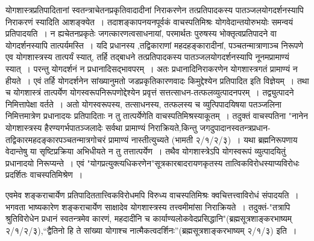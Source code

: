 {योगशास्त्रप्रतिपादितानां स्वतन्त्राचेतनप्रकृतिवादादीनां निराकरणेन तत्प्रतिपादकस्य पातञ्जलयोगदर्शनस्यापि निराकरणं स्यादिति आशङ्क्येत~। तदाशङ्कापनयनपूर्वकं वाचस्पतिमिश्रः योगवेदान्तयोरुभयोः समन्वयं प्रतिपादयति~। न ह्यचेतनप्रकृतेः जगत्कारणत्वसाधनायां, परमार्थतः पुरुषस्य भोक्तृत्वप्रतिपादने वा योगदर्शनस्यापि तात्पर्यमस्ति~। यदि प्रधानस्य ,तद्विकाराणां महदहङ्कारादीनां, पञ्चतन्मात्राणाञ्च निरूपणे एव योगशास्त्रस्य तात्पर्यं स्यात्, तर्हि तद्बाधने तत्प्रतिपादकस्य पातञ्जलयोगदर्शनस्यापि नूनमप्रामाण्यं स्यात्~। परन्तु योगदर्शनं न प्रधानादिसद्भावपरम्~। अतः प्रधानादिनिराकरणेन योगशास्त्रगतं प्रामाण्यं न हीयते~। एवं तर्हि योगदर्शनेन सांख्यानुमतो जडप्रकृतिकारणवादः किमुद्देश्येन प्रतिपादित इति विज्ञेयम्~। तथा च योगशास्त्रं तात्पर्येण योगस्वरूपनिरूपणोद्देश्येन प्रवृत्तं सत्तत्साधन-तत्फलव्युत्पादनपरम्~। तद्व्युत्पादने निमित्तापेक्षा वर्तते~। अतो योगस्वरूपस्य, तत्साधनस्य, तत्फलस्य च व्युत्पिपादयिषया पतञ्जलिना निमित्तमात्रेण प्रधानादयः प्रतिपादिताः न तु तात्पर्येणेति वाचस्पतिमिश्रस्याकूतम्~। तदुक्तं वाचस्पतिना "नानेन योगशास्त्रस्य हैरण्यगर्भपातञ्जलादेः सर्वथा प्रामाण्यं निराक्रियते,किन्तु जगदुपादानस्वतन्त्रप्रधान-तद्विकारमहदङ्कारपञ्चतन्मात्रगोचरं प्रामाण्यं नास्तीत्युच्यते (भामती २/१/२/३)~। यथा ब्रह्मनिरूपणाय वेदान्तेषु या सृष्टिप्रक्रिया अभिधीयते न तु तत्तात्पर्येण~। तथैव योगशास्त्रेऽपि योगस्वरूपं व्युत्पादयितुं प्रधानादयो निरूप्यन्ते~। एवं "योगप्रत्युक्त्यधिकरणेन"सूत्रकारबादरायणकृतस्य तात्विकविरोधस्याप्यविरोधः प्रदर्शितः वाचस्पतिमिश्रेण~। 

एवमेव शङ्कराचार्येण प्रतिपादिततात्त्विकविरोधमपि विरुध्य वाचस्पतिमिश्रः क्वचित्तत्त्वाविरोधं संपादयति~। भगवता भाष्यकारेण शङ्कराचार्येण साक्षादेव योगशास्त्रस्य तत्त्वमीमांसा निराक्रियते~। तदुक्तं-"तत्रापि श्रुतिविरोधेन प्रधानं स्वतन्त्रमेव कारणं, महदादीनि च कार्याण्यलोकवेदप्रसिद्धानि"(ब्रह्मसूत्रशाङ्करभाष्यम् २/१/२/३),“द्वैतिनो हि ते सांख्या योगाश्च नात्मैकत्वदर्शिनः”(ब्रह्मसूत्रशाङ्करभाष्यम् २/१/३) इति~। 

}

